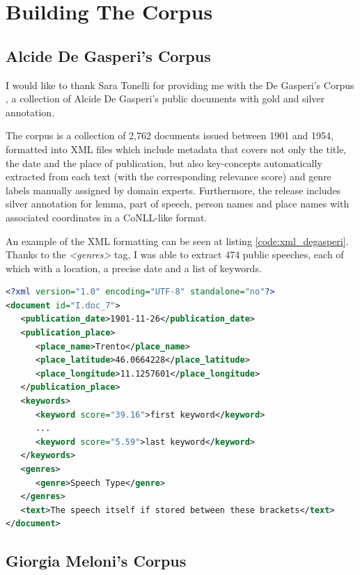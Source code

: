 \section{Building The Corpus}

\subsection{Alcide De Gasperi's Corpus}

I would like to thank Sara Tonelli for providing me with the De Gasperi's Corpus \cite{tonelli_prendo_2019}, a collection of Alcide De Gasperi's public documents with gold and silver annotation.

The corpus is a collection of 2,762 documents issued between 1901 and 1954, formatted into XML files which include metadata that covers not only the title, the date and the place of publication, but also key-concepts automatically extracted from each text (with the corresponding relevance score) and genre labels manually assigned by domain experts. Furthermore, the release includes silver annotation for lemma, part of speech, person names and place names with associated coordinates in a CoNLL-like format.

An example of the XML formatting can be seen at listing \ref{code:xml_degasperi}. 
Thanks to the \textit{<genres>} tag, I was able to extract 474 public speeches, each of which with a location, a precise date and a list of keywords.

\begin{lstlisting}[language={XML},label={code:xml_degasperi}, caption={An example of how a single speech in De Gasperi's Corpus is formatted in XML}]
<?xml version="1.0" encoding="UTF-8" standalone="no"?>
<document id="I.doc_7">
   <publication_date>1901-11-26</publication_date>
   <publication_place>
      <place_name>Trento</place_name>
      <place_latitude>46.0664228</place_latitude>
      <place_longitude>11.1257601</place_longitude>
   </publication_place>
   <keywords>
      <keyword score="39.16">first keyword</keyword>
      ...
      <keyword score="5.59">last keyword</keyword>
   </keywords>
   <genres>
      <genre>Speech Type</genre>
   </genres>
   <text>The speech itself if stored between these brackets</text>
</document>
\end{lstlisting}

\subsection{Giorgia Meloni's Corpus}

